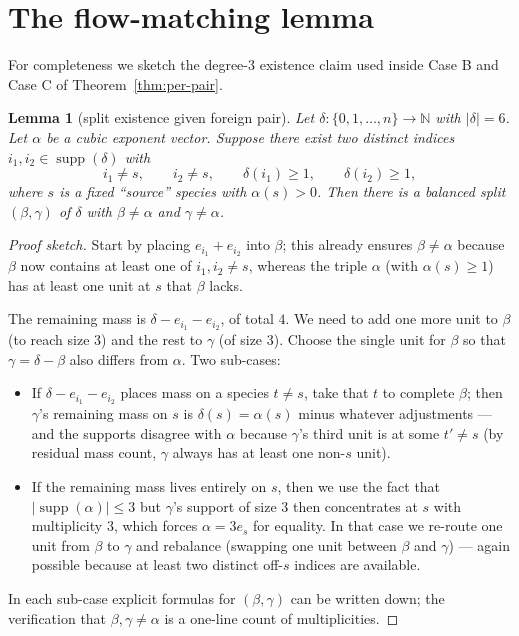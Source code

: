 \documentclass[11pt]{article}
\newtheorem{lemma}[theorem]{Lemma}
\newcommand{\N}{\mathbb{N}}
\DeclareMathOperator{\supp}{supp}
\begin{document}
\section{The flow-matching lemma}
\label{sec:flow}

For completeness we sketch the degree-$3$ existence claim used inside
Case B and Case C of Theorem~\ref{thm:per-pair}.

\begin{lemma}[split existence given foreign pair]
\label{lem:flow}
Let $\delta : \{0,1,\dots,n\} \to \N$ with $|\delta|=6$. Let $\alpha$ be
a cubic exponent vector. Suppose there exist two distinct indices
$i_1, i_2 \in \supp(\delta)$ with
\[
   i_1 \ne s, \qquad i_2 \ne s, \qquad \delta(i_1) \ge 1, \qquad \delta(i_2) \ge 1,
\]
where $s$ is a fixed ``source'' species with $\alpha(s) > 0$. Then
there is a balanced split $(\beta, \gamma)$ of $\delta$ with
$\beta \ne \alpha$ and $\gamma \ne \alpha$.
\end{lemma}

\begin{proof}[Proof sketch]
Start by placing $e_{i_1} + e_{i_2}$ into $\beta$; this already ensures
$\beta \ne \alpha$ because $\beta$ now contains at least one of
$i_1, i_2 \ne s$, whereas the triple $\alpha$ (with $\alpha(s) \ge 1$)
has at least one unit at $s$ that $\beta$ lacks.

The remaining mass is $\delta - e_{i_1} - e_{i_2}$, of total $4$. We need
to add one more unit to $\beta$ (to reach size $3$) and the rest to
$\gamma$ (of size $3$). Choose the single unit for $\beta$ so that
$\gamma = \delta - \beta$ also differs from $\alpha$. Two sub-cases:
\begin{itemize}
\item If $\delta - e_{i_1} - e_{i_2}$ places mass on a species $t \ne s$,
take that $t$ to complete $\beta$; then $\gamma$'s remaining mass on
$s$ is $\delta(s) = \alpha(s)$ minus whatever adjustments --- and the
supports disagree with $\alpha$ because $\gamma$'s third unit is at some
$t' \ne s$ (by residual mass count, $\gamma$ always has at least one
non-$s$ unit).
\item If the remaining mass lives entirely on $s$, then we use the fact
that $|\supp(\alpha)| \le 3$ but $\gamma$'s support of size $3$ then
concentrates at $s$ with multiplicity $3$, which forces
$\alpha = 3 e_s$ for equality. In that case we re-route one unit from
$\beta$ to $\gamma$ and rebalance (swapping one unit between $\beta$
and $\gamma$) --- again possible because at least two distinct
off-$s$ indices are available.
\end{itemize}
In each sub-case explicit formulas for $(\beta, \gamma)$ can be
written down; the verification that $\beta, \gamma \ne \alpha$ is a
one-line count of multiplicities.
\end{proof}
\end{document}
